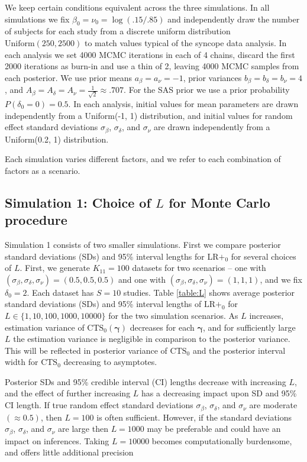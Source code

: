 \documentclass[AMA,STIX1COL]{WileyNJD-v2}
\newcommand{\boldgamma}{\boldsymbol{\gamma}}
\newcommand{\CTSo}{\text{CTS}_0}
\begin{document}
\noindent We keep certain conditions equivalent across the three simulations. In all simulations we fix $\beta_0 = \nu_0 = \log(.15 / .85)$ and independently draw the number of subjects for each study from a discrete uniform distribution $\text{Uniform}(250, 2500)$ to match values typical of the syncope data analysis. In each analysis we set 4000 MCMC iterations in each of 4 chains, discard the first 2000 iterations as burn-in and use a thin of 2, leaving 4000 MCMC samples from each posterior. We use prior means $a_{\beta} = a_{\nu} = -1$, prior variances $b_{\beta} = b_{\delta} = b_{\nu} = 4$, and $A_{\beta} = A_{\delta} = A_{\nu} = \frac{1}{\sqrt{2}} \approx .707$. For the SAS prior we use a prior probability $P(\delta_0 = 0) = 0.5$. In each analysis, initial values for mean parameters are drawn independently from a Uniform(-1, 1) distribution, and initial values for random effect standard deviations $\sigma_{\beta}$, $\sigma_{\delta}$, and $\sigma_{\nu}$ are drawn independently from a Uniform(0.2, 1) distribution.

Each simulation varies different factors, and we refer to each combination of factors as a scenario.

\subsection{Simulation 1: Choice of $L$ for Monte Carlo procedure} \label{sec:L}

Simulation 1 consists of two smaller simulations. First we compare posterior standard deviations (SDs) and 95\% interval lengths for LR$+_0$ for several choices of $L$. First, we generate $K_{11} = 100$ datasets for two scenarios -- one with $(\sigma_{\beta}, \sigma_{\delta}, \sigma_{\nu}) = (0.5, 0.5, 0.5)$ and one with $(\sigma_{\beta}, \sigma_{\delta}, \sigma_{\nu}) = (1, 1, 1)$, and we fix $\delta_0 = 2$. Each dataset has $S = 10$ studies. Table \ref{table:L} shows average posterior standard deviations (SDs) and 95\% interval lengths of $\mbox{LR}+_{0}$ for $L \in \{1, 10, 100, 1000, 10000\}$ for the two simulation scenarios. As $L$ increases, estimation variance of $\CTSo(\boldgamma)$ decreases for each $\boldgamma$, and for sufficiently large $L$ the estimation variance is negligible in comparison to the posterior variance. This will be reflected in posterior variance of $\CTSo$ and the posterior interval width for $\CTSo$ decreasing to asymptotes.

Posterior SDs and 95\% credible interval (CI) lengths decrease with increasing $L$, and the effect of further increasing $L$ has a decreasing impact upon SD and 95\% CI length. If true random effect standard deviations $\sigma_{\beta}$, $\sigma_{\delta}$, and $\sigma_{\nu}$ are moderate $(\approx 0.5)$, then $L=100$ is often sufficient. However, if the standard deviations $\sigma_{\beta}$, $\sigma_{\delta}$, and $\sigma_{\nu}$ are large then $L = 1000$ may be preferable and could have an impact on inferences. Taking $L = 10000$ becomes computationally burdensome, and offers little additional precision
\end{document}
